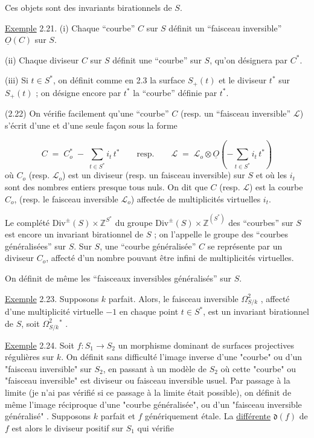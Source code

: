 Ces objets sont des invariants birationnels de $S$.

\underline{Exemple} 2.21. (i) Chaque ``courbe'' $C$ sur $S$ définit un ``faisceau inversible'' $\underline{O}(C)$ sur $S$.

(ii) Chaque diviseur $C$ sur $S$ définit une ``courbe'' sur $S$, qu'on désignera par $C^*$.

(iii) Si $t \in S^*$, on définit comme en 2.3 la surface $S_+(t)$ et le diviseur $t^*$ sur $S_+(t)$ ; on désigne encore par $t^*$ la ``courbe'' définie par $t^*$.

(2.22) On vérifie facilement qu'une ``courbe'' $C$ (resp. un ``faisceau inversible'' $\mathcal{L}$) s'écrit d'une et d'une seule façon sous la forme

\begin{equation*}
C \;=\; C_o^* \;-\; \sum_{t \in S^*} i_t \, t^* \qquad \text{resp.} \qquad \mathcal{L} \;=\; \mathcal{L}_o \otimes \underline{O} \left( -\sum_{t \in S^*} i_t \, t^* \right)
\end{equation*}
où $C_o$ (resp. $\mathcal{L}_o$) est un diviseur (resp. un faisceau inversible) sur $S$ et où les $i_t$ sont des nombres entiers presque tous nuls. On dit que $C$ (resp. $\mathcal{L}$) est la courbe $C_o$, (resp. le faisceau inversible $\mathcal{L}_o$) affectée de multiplicités virtuelles $i_t$.

Le complété $\mathrm{Div}^{\pm} (S) \times \mathbb{Z}^{S^*}$ du groupe $\mathrm{Div}^{\pm} (S) \times \mathbb{Z}^{(S^*)}$ des ``courbes'' sur $S$ est encore un invariant birationnel de $S$ ; on l'appelle le groupe des ``courbes généralisées'' sur $S$. Sur $S$, une ``courbe généralisée'' $C$ se représente par un diviseur $C_o$, affecté d'un nombre pouvant être infini de multiplicités virtuelles.

On définit de même les ``faisceaux inversibles généralisés'' sur $S$.



\underline{Exemple} 2.23. Supposons $k$ parfait. Alors, le faisceau inversible $\Omega^2_{S/k}$ , affecté d'une multiplicité virtuelle $-1$ en chaque point $t \in S^*$, est un invariant birationnel de $S$, soit $\Omega^2_{S/k}{}^*$ .

\underline{Exemple} 2.24.  Soit $f : S_1 \longrightarrow S_2$ un morphisme dominant de surfaces projectives régulières sur $k$. On définit sans difficulté l'image inverse d'une "courbe" ou d'un "faisceau inversible" sur $S_2$, en passant à un modèle de $S_2$ où cette "courbe" ou "faisceau inversible" est diviseur ou faisceau inversible usuel. Par passage à la limite (je n'ai pas vérifié si ce passage à la limite était possible), on définit de même l'image réciproque d'une "courbe généralisée", ou d'un "faisceau inversible généralisé" . Supposons $k$ parfait et $f$ génériquement étale. La \underline{différente} $\mathfrak{d}(f)$ de $f$ est alors le diviseur positif sur $S_1$ qui vérifie

